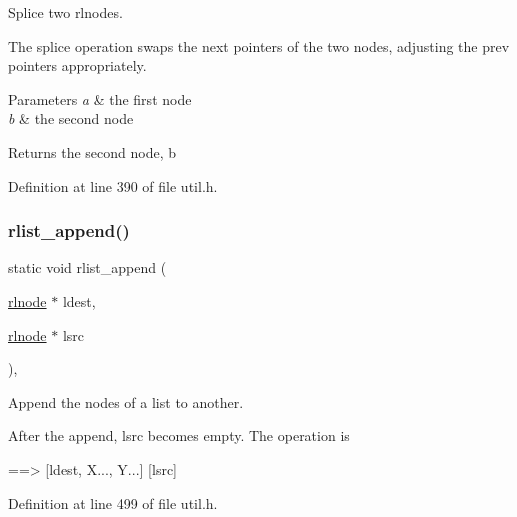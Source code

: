 Splice two rlnodes. 

The splice operation swaps the {\ttfamily next} pointers of the two nodes, adjusting the {\ttfamily prev} pointers appropriately.


\begin{DoxyParams}{Parameters}
{\em a} & the first node \\
\hline
{\em b} & the second node \\
\hline
\end{DoxyParams}
\begin{DoxyReturn}{Returns}
the second node, {\ttfamily b} 
\end{DoxyReturn}


Definition at line 390 of file util.\+h.

\mbox{\label{group__rlists_ga7f5989d7ec35645d6bbb1c15cd438532}} 
\subsubsection{\texorpdfstring{rlist\+\_\+append()}{rlist\_append()}}
{\footnotesize\ttfamily static void rlist\+\_\+append (\begin{DoxyParamCaption}\item[{\hyperlink{group__rlists_ga8f6244877f7ce2322c90525217ea6e7a}{rlnode} $\ast$}]{ldest,  }\item[{\hyperlink{group__rlists_ga8f6244877f7ce2322c90525217ea6e7a}{rlnode} $\ast$}]{lsrc }\end{DoxyParamCaption})\hspace{0.3cm}{\ttfamily [inline]}, {\ttfamily [static]}}



Append the nodes of a list to another. 

After the append, {\ttfamily lsrc} becomes empty. The operation is \begin{DoxyVerb}[ldest, X...] [lsrc, Y...]  ==> [ldest, X..., Y...]  [lsrc]
\end{DoxyVerb}
 

Definition at line 499 of file util.\+h.

\mbox{\label{group__rlists_gac02a33ca2f63b5dc5e9597a54da32cf4}} 
